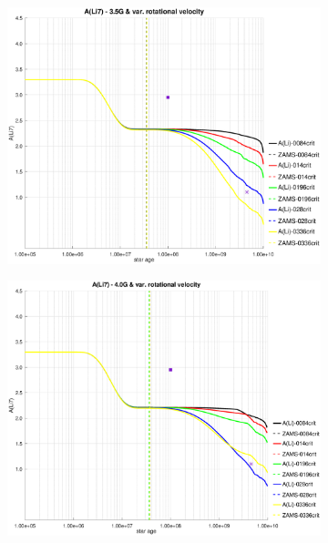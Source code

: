 \documentclass[fleqn,usenatbib]{mnras}
\begin{document}
{{\begin{figure}
\begin{subfigure}[h]{0.47\textwidth}
    \label{fig:subim2}
    \end{subfigure}
    \begin{subfigure}[h]{0.47\textwidth}
    \includegraphics[trim = 35mm 15mm 20mm 15mm, clip,width=\textwidth]{figures/li_var_vel_3_5g.eps}
    \label{fig:subim3}
    \end{subfigure}
    \begin{subfigure}[h]{0.47\textwidth}
    \includegraphics[trim = 35mm 15mm 20mm 15mm, clip,width=\textwidth]{figures/li_var_vel_4_0g.eps}
    \label{fig:subim4}
    \end{subfigure}

\end{figure}}}
\end{document}
